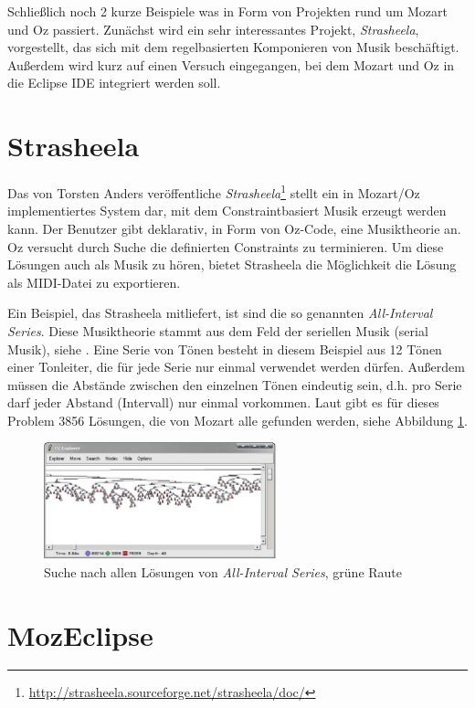 Schließlich noch 2 kurze Beispiele was in Form von Projekten rund um Mozart und
Oz passiert. Zunächst wird ein sehr interessantes Projekt, \textsl{Strasheela},
vorgestellt, das sich mit dem regelbasierten Komponieren von Musik beschäftigt.
Außerdem wird kurz auf einen Versuch eingegangen, bei dem Mozart und Oz in die
Eclipse IDE integriert werden soll. 

\section{Strasheela}

Das von Torsten Anders veröffentliche
\textsl{Strasheela}\footnote{\url{http://strasheela.sourceforge.net/strasheela/doc/}} 
stellt ein in Mozart/Oz implementiertes System dar, mit dem Constraintbasiert
Musik erzeugt werden kann. Der Benutzer gibt deklarativ, in Form von Oz-Code, eine
Musiktheorie an. Oz versucht durch Suche die definierten Constraints zu
terminieren. Um diese Lösungen auch als Musik zu hören, bietet Strasheela die
Möglichkeit die Lösung als MIDI-Datei zu exportieren.

Ein Beispiel, das Strasheela mitliefert, ist sind die so genannten 
\textsl{All-Interval Series}. Diese Musiktheorie stammt aus dem Feld der 
seriellen Musik (serial Musik), siehe \cite{url:serielleMusik}. Eine Serie von 
Tönen besteht in diesem Beispiel aus 12 Tönen einer Tonleiter, die für jede 
Serie nur einmal verwendet werden dürfen. Außerdem müssen die Abstände zwischen 
den einzelnen Tönen eindeutig sein, d.h. pro Serie darf jeder Abstand 
(Intervall) nur einmal vorkommen. Laut \cite{url:strasheela} gibt es für dieses 
Problem 3856 Lösungen, die von Mozart alle gefunden werden, siehe Abbildung 
\ref{fig:strasheela-search}.

\begin{figure}
 \centering
 \includegraphics[width=0.6\textwidth]{../images/strasheela-search}
 \caption{Suche nach allen Lösungen von \textsl{All-Interval Series}, grüne
 Raute}
 \label{fig:strasheela-search}
\end{figure}


\section{MozEclipse}

